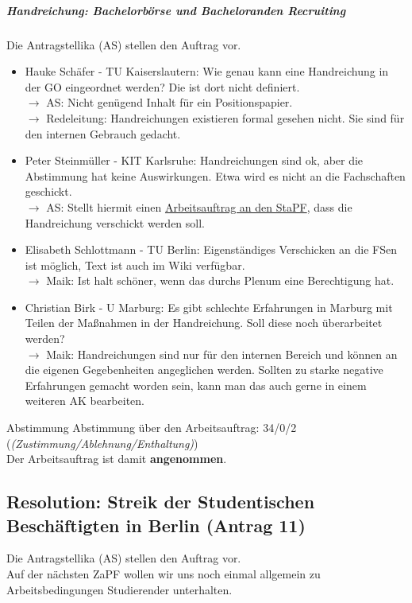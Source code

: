   \subparagraph{Handreichung: Bachelorbörse und Bacheloranden Recruiting}
    Die Antragstellika (AS) stellen den Auftrag vor.

    \begin{itemize}
      \item Hauke Schäfer - TU Kaiserslautern:  Wie genau kann eine Handreichung in der GO eingeordnet werden? Die ist dort nicht definiert. \\
        $\rightarrow$ AS: Nicht genügend Inhalt für ein Positionspapier. \\
        $\rightarrow$ Redeleitung: Handreichungen existieren formal gesehen nicht. Sie sind für den internen Gebrauch gedacht.
      \item Peter Steinmüller - KIT Karlsruhe:  Handreichungen sind ok, aber die Abstimmung hat keine Auswirkungen. Etwa wird es nicht an die Fachschaften geschickt. \\
        $\rightarrow$ AS: Stellt hiermit einen \underline{Arbeitsauftrag an den StaPF}, dass die Handreichung verschickt werden soll.
      \item Elisabeth Schlottmann - TU Berlin:  Eigenständiges Verschicken an die FSen ist möglich, Text ist auch im Wiki verfügbar. \\
        $\rightarrow$ Maik: Ist halt schöner, wenn das durchs Plenum eine Berechtigung hat.
      \item Christian Birk - U Marburg:  Es gibt schlechte Erfahrungen in Marburg mit Teilen der Maßnahmen in der Handreichung. Soll diese noch überarbeitet werden? \\
        $\rightarrow$ Maik: Handreichungen sind nur für den internen Bereich und können an die eigenen Gegebenheiten angeglichen werden. Sollten zu starke negative Erfahrungen gemacht worden sein, kann man das auch gerne in einem weiteren AK bearbeiten.
    \end{itemize}

    \begin{success}{Abstimmung}
      Abstimmung über den Arbeitsauftrag: 34/0/2 (\textit{(Zustimmung/Ablehnung/Enthaltung)}) \\
      Der Arbeitsauftrag ist damit \textbf{angenommen}.
    \end{success}

  \subsection{Resolution: Streik der Studentischen Beschäftigten in Berlin (Antrag 11)}
    Die Antragstellika (AS) stellen den Auftrag vor. \\
    Auf der nächsten ZaPF wollen wir uns noch einmal allgemein zu Arbeitsbedingungen Studierender unterhalten.

